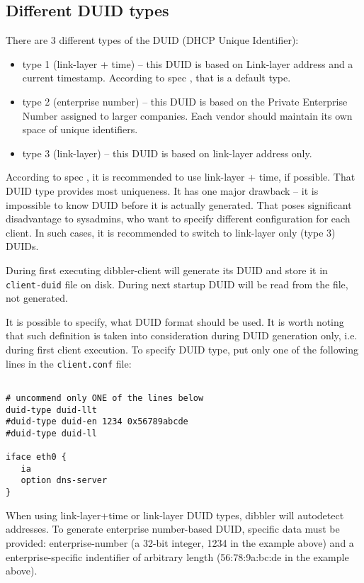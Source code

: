 \subsection{Different DUID types}
\label{feature-duid-types}
There are 3 different types of the DUID (DHCP Unique Identifier):
\begin{itemize}
\item type 1 (link-layer + time) -- this DUID is based on Link-layer
  address and a current timestamp. According to spec \cite{rfc3315},
  that is a default type.
\item type 2 (enterprise number) -- this DUID is based on the Private
  Enterprise Number assigned to larger companies. Each vendor should
  maintain its own space of unique identifiers.
\item type 3 (link-layer) -- this DUID is based on link-layer address
  only.
\end{itemize}

According to spec \cite{rfc3315}, it is recommended to use link-layer
+ time, if possible. That DUID type provides most uniqueness. It has
one major drawback -- it is impossible to know DUID before it is
actually generated. That poses significant disadvantage to sysadmins,
who want to specify different configuration for each client. In such
cases, it is recommended to switch to link-layer only (type 3) DUIDs.

During first executing dibbler-client will generate its DUID and store
it in \verb+client-duid+ file on disk. During next startup DUID will
be read from the file, not generated.

It is possible to specify, what DUID format should be used. It is
worth noting that such definition is taken into consideration during
DUID generation only, i.e. during first client execution. To specify
DUID type, put only one of the following lines in the
\verb+client.conf+ file:

\begin{lstlisting}

# uncommend only ONE of the lines below
duid-type duid-llt
#duid-type duid-en 1234 0x56789abcde
#duid-type duid-ll

iface eth0 {
   ia
   option dns-server
}
\end{lstlisting}

When using link-layer+time or link-layer DUID types, dibbler will
autodetect addresses. To generate enterprise number-based DUID,
specific data must be provided: enterprise-number (a 32-bit integer,
1234 in the example above) and a enterprise-specific indentifier of
arbitrary length (56:78:9a:bc:de in the example above).

